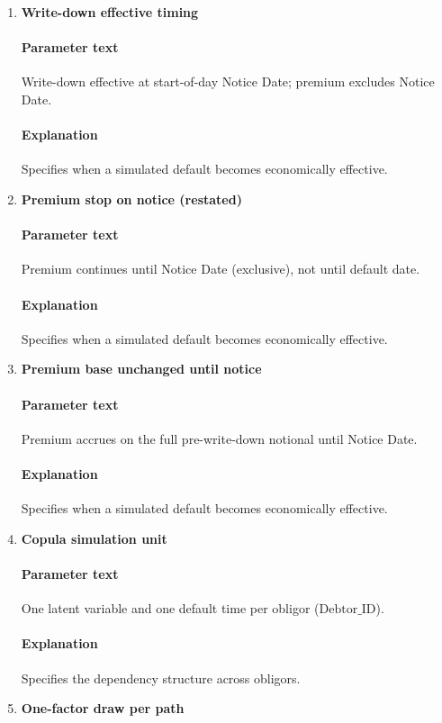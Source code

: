 \documentclass[11pt]{article}
\begin{document}
\begin{enumerate}[label=\arabic*),leftmargin=*,align=left]
\item \textbf{Write-down effective timing}
\paragraph{Parameter text} Write-down effective at start-of-day Notice Date; premium excludes Notice Date.
\paragraph{Explanation} Specifies when a simulated default becomes economically effective.

\item \textbf{Premium stop on notice (restated)}
\paragraph{Parameter text} Premium continues until Notice Date (exclusive), not until default date.
\paragraph{Explanation} Specifies when a simulated default becomes economically effective.

\item \textbf{Premium base unchanged until notice}
\paragraph{Parameter text} Premium accrues on the full pre-write-down notional until Notice Date.
\paragraph{Explanation} Specifies when a simulated default becomes economically effective.

\item \textbf{Copula simulation unit}
\paragraph{Parameter text} One latent variable and one default time per obligor ($\text{Debtor\_ID}$).
\paragraph{Explanation} Specifies the dependency structure across obligors.

\item \textbf{One-factor draw per path}

\end{enumerate}
\end{document}
